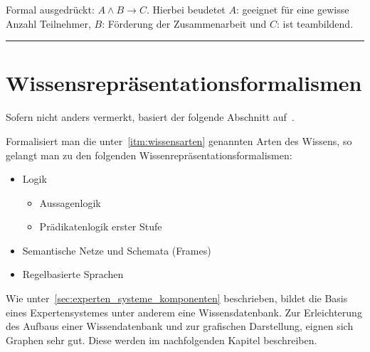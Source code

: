 Formal ausgedrückt: $A \wedge B \rightarrow C$. Hierbei beudetet $A$: geeignet für eine gewisse Anzahl Teilnehmer, $B$: Förderung der Zusammenarbeit und $C$: ist teambildend.\\

\noindent\rule[1ex]{\textwidth}{1pt}

\section{Wissensrepräsentationsformalismen}
\label{sec:wissensrepräsentationsformalismen}
Sofern nicht anders vermerkt, basiert der folgende Abschnitt auf~\cite[S. 32]{laemmel}.

Formalisiert man die unter~\ref{itm:wissensarten} genannten Arten des Wissens, so gelangt man zu den folgenden Wissenrepräsentationsformalismen:
\begin{itemize}
    \item Logik
        \begin{itemize}
            \item Aussagenlogik
            \item Prädikatenlogik erster Stufe
        \end{itemize}
    \item Semantische Netze und Schemata (Frames)
    \item Regelbasierte Sprachen
\end{itemize}

Wie unter~\ref{sec:experten_systeme_komponenten} beschrieben, bildet die Basis eines Expertensystemes unter anderem eine Wissensdatenbank. Zur Erleichterung des Aufbaus einer Wissendatenbank und zur grafischen Darstellung, eignen sich Graphen sehr gut. Diese werden im nachfolgenden Kapitel beschreiben.
